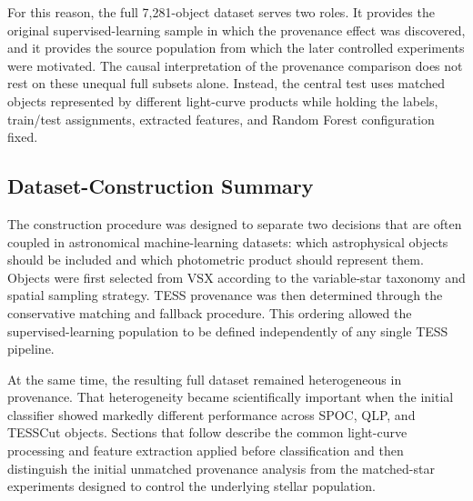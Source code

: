 \documentclass[linenumbers]{aastex701}
\begin{document}
For this reason, the full 7,281-object dataset serves two roles. It provides the original supervised-learning sample in which the provenance effect was discovered, and it provides the source population from which the later controlled experiments were motivated. The causal interpretation of the provenance comparison does not rest on these unequal full subsets alone. Instead, the central test uses matched objects represented by different light-curve products while holding the labels, train/test assignments, extracted features, and Random Forest configuration fixed.


\subsection{Dataset-Construction Summary}
\label{subsec:dataset_summary}

The construction procedure was designed to separate two decisions that are often coupled in astronomical machine-learning datasets: which astrophysical objects should be included and which photometric product should represent them. Objects were first selected from VSX according to the variable-star taxonomy and spatial sampling strategy. TESS provenance was then determined through the conservative matching and fallback procedure. This ordering allowed the supervised-learning population to be defined independently of any single TESS pipeline.

At the same time, the resulting full dataset remained heterogeneous in provenance. That heterogeneity became scientifically important when the initial classifier showed markedly different performance across SPOC, QLP, and TESSCut objects. Sections that follow describe the common light-curve processing and feature extraction applied before classification and then distinguish the initial unmatched provenance analysis from the matched-star experiments designed to control the underlying stellar population.





\end{document}
